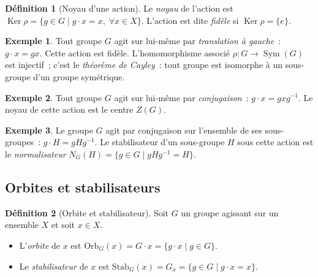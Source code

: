\documentclass[12pt,a4paper,openany]{book}
\theoremstyle{definition}
\newtheorem{definition}{Définition}[chapter]
\newtheorem{exemple}{Exemple}[chapter]
\DeclareMathOperator{\Sym}{Sym}
\DeclareMathOperator{\Ker}{Ker}
\begin{document}
\begin{definition}[Noyau d'une action]\label{def:noyau-action}
  Le \emph{noyau} de l'action est
  $\Ker\rho = \{g\in G\mid g\cdot x = x,\;\forall x\in X\}$.
  L'action est dite \emph{fidèle} si
  $\Ker\rho = \{e\}$.
\end{definition}

\begin{exemple}\label{ex:action-translation}
  Tout groupe $G$ agit sur lui-même par \emph{translation à
  gauche}~: $g\cdot x = gx$. Cette action est
  fidèle. L'homomorphisme associé $\rho\colon G\to\Sym(G)$ est injectif~;
  c'est le \emph{théorème de Cayley}~:
  tout groupe est isomorphe à un sous-groupe d'un groupe symétrique.
\end{exemple}

\begin{exemple}\label{ex:action-conjugaison}
  Tout groupe $G$ agit sur lui-même par
  \emph{conjugaison}~:
  $g\cdot x = gxg^{-1}$. Le noyau de cette action est le centre
  $Z(G)$.
\end{exemple}

\begin{exemple}\label{ex:action-sous-groupes}
  Le groupe $G$ agit par conjugaison sur l'ensemble de ses
  sous-groupes~: $g\cdot H = gHg^{-1}$. Le stabilisateur d'un
  sous-groupe $H$ sous cette action est le \emph{normalisateur}
  $N_G(H) = \{g\in G\mid gHg^{-1}=H\}$.
\end{exemple}

\subsection{Orbites et stabilisateurs}\label{subsec:orbites-stab}

\begin{definition}[Orbite et stabilisateur]\label{def:orbite-stab}
  Soit $G$ un groupe agissant sur un ensemble $X$ et soit $x\in X$.
  \begin{itemize}
    \item L'\emph{orbite} de $x$ est
      $\mathrm{Orb}_G(x) = G\cdot x = \{g\cdot x\mid g\in G\}$.
    \item Le \emph{stabilisateur} de $x$ est
      $\mathrm{Stab}_G(x) = G_x = \{g\in G\mid g\cdot x = x\}$.
  \end{itemize}
\end{definition}
\end{document}
